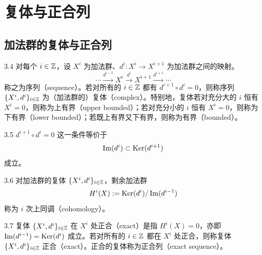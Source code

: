 \section{复体与正合列}

\subsection{加法群的复体与正合列}

\begin{definition}{3.4}
对每个 $i\in\mathbb{Z}$，设 $X^i$ 为加法群、$d^i\colon X^i\to X^{i+1}$ 为加法群之间的映射。
\[
\cdots \xrightarrow{d^{i-1}} X^i \xrightarrow{d^i} X^{i+1} \xrightarrow{d^{i+1}} \cdots
\]
称之为序列（sequence）。若对所有的 $i\in\mathbb{Z}$ 都有 $d^{i+1}\circ d^i=0$，则称序列 $\{X^i,d^i\}_{i\in\mathbb{Z}}$ 为（加法群的）复体（complex）。特别地，复体若对充分大的 $i$ 恒有 $X^i=0$，则称为上有界（upper bounded）；若对充分小的 $i$ 恒有 $X^i=0$，则称为下有界（lower bounded）；若既上有界又下有界，则称为有界（bounded）。
\end{definition}

\begin{remark}{3.5} $d^{i+1}\circ d^i=0$ 这一条件等价于
\[
\operatorname{Im}(d^i)\subset \operatorname{Ker}(d^{i+1})
\]
成立。
\end{remark}

\begin{definition}{3.6} 对加法群的复体 $\{X^i,d^i\}_{i\in\mathbb{Z}}$，剩余加法群
\[
H^i(X):=\operatorname{Ker}(d^i)/\operatorname{Im}(d^{i-1})
\]
称为 $i$ 次上同调（cohomology）。
\end{definition}

\begin{definition}{3.7} 复体 $\{X^i,d^i\}_{i\in\mathbb{Z}}$ 在 $X^i$ 处正合（exact）是指 $H^i(X)=0$，亦即 $\operatorname{Im}(d^{i-1})=\operatorname{Ker}(d^i)$ 成立。若对所有的 $i\in\mathbb{Z}$ 都在 $X^i$ 处正合，则称复体 $\{X^i,d^i\}_{i\in\mathbb{Z}}$ 正合（exact）。正合的复体称为正合列（exact sequence）。
\end{definition}


